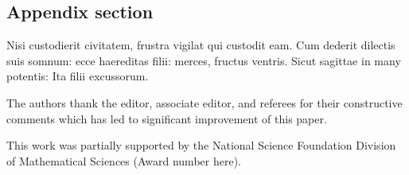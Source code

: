 \documentclass[linenumber]{jdsart}
\theoremstyle{plain}
\theoremstyle{remark}
\theoremstyle{definition}
\begin{document}
\begin{appendix}
\section{Appendix section}

Nisi custodierit civitatem,
frustra vigilat qui custodit eam. Cum dederit dilectis suis somnum:
ecce haereditas filii: merces, fructus ventris. Sicut sagittae in
many potentis: Ita filii excussorum.
\end{appendix}

\begin{acknowledgement}[title={Acknowledgments}]
The authors thank the editor, associate editor, and referees for their
constructive comments which has led to significant improvement of this
paper.
\end{acknowledgement}

\begin{funding}
This work was partially supported by the National Science Foundation
Division of Mathematical Sciences (Award number here).
\end{funding}



\end{document}
